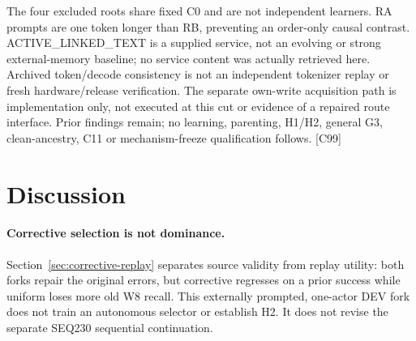 \documentclass{article}
\begin{document}
The four excluded roots share fixed C0 and are not independent learners. RA
prompts are one token longer than RB, preventing an order-only causal contrast.
ACTIVE\_LINKED\_TEXT is a supplied service, not an evolving or strong
external-memory baseline; no service content was actually retrieved here.
Archived token/decode consistency is not an independent tokenizer replay or
fresh hardware/release verification. The separate own-write acquisition path
is implementation only, not executed at this cut or evidence of a repaired
route interface. Prior findings remain; no learning, parenting, H1/H2, general
G3, clean-ancestry, C11 or mechanism-freeze qualification follows. [C99]

\section{Discussion}
\label{sec:discussion}

\paragraph{Corrective selection is not dominance.}
Section~\ref{sec:corrective-replay} separates source validity from replay utility:
both forks repair the original errors, but corrective regresses on a prior
success while uniform loses more old W8 recall. This externally prompted,
one-actor DEV fork does not train an autonomous selector or establish H2.
It does not revise the separate SEQ230 sequential continuation.

\end{document}

